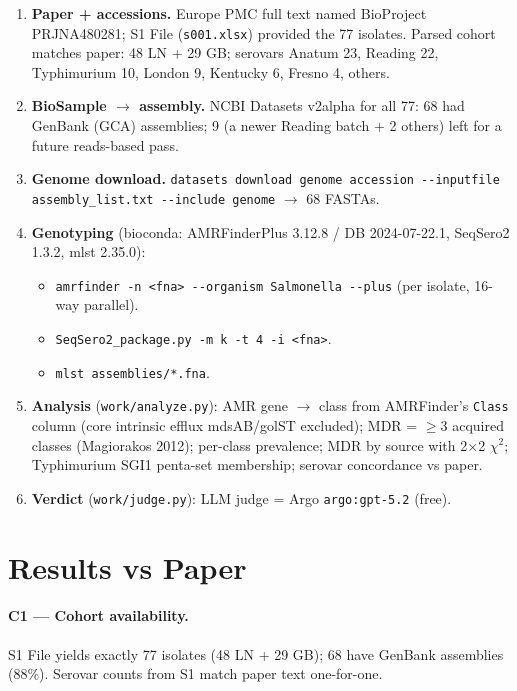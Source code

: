 \documentclass[11pt]{article}
\begin{document}
\begin{enumerate}[leftmargin=*]
  \item \textbf{Paper + accessions.} Europe PMC full text named BioProject PRJNA480281; S1 File (\texttt{s001.xlsx})
        provided the 77 isolates. Parsed cohort matches paper: 48 LN + 29 GB; serovars Anatum 23, Reading 22,
        Typhimurium 10, London 9, Kentucky 6, Fresno 4, others.
  \item \textbf{BioSample $\to$ assembly.} NCBI Datasets v2alpha for all 77: 68 had GenBank (GCA) assemblies;
        9 (a newer Reading batch + 2 others) left for a future reads-based pass.
  \item \textbf{Genome download.} \texttt{datasets download genome accession -{}-inputfile assembly\_list.txt -{}-include genome}
        $\to$ 68 FASTAs.
  \item \textbf{Genotyping} (bioconda: AMRFinderPlus 3.12.8 / DB 2024-07-22.1, SeqSero2 1.3.2, mlst 2.35.0):
    \begin{itemize}
      \item \texttt{amrfinder -n <fna> -{}-organism Salmonella -{}-plus} (per isolate, 16-way parallel).
      \item \texttt{SeqSero2\_package.py -m k -t 4 -i <fna>}.
      \item \texttt{mlst assemblies/*.fna}.
    \end{itemize}
  \item \textbf{Analysis} (\texttt{work/analyze.py}): AMR gene $\to$ class from AMRFinder's \texttt{Class} column
        (core intrinsic efflux mdsAB/golST excluded); MDR = $\geq$3 acquired classes (Magiorakos 2012);
        per-class prevalence; MDR by source with 2$\times$2 $\chi^2$; Typhimurium SGI1 penta-set membership;
        serovar concordance vs paper.
  \item \textbf{Verdict} (\texttt{work/judge.py}): LLM judge = Argo \texttt{argo:gpt-5.2} (free).
\end{enumerate}

\section{Results vs Paper}

\paragraph{C1 --- Cohort availability.}
S1 File yields exactly 77 isolates (48 LN + 29 GB); 68 have GenBank assemblies (88\%). Serovar counts from
S1 match paper text one-for-one.
\end{document}

